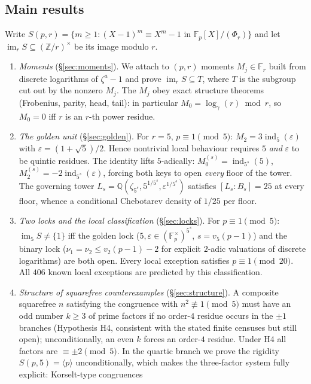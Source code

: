 \documentclass[11pt]{amsart}
\theoremstyle{definition}
\theoremstyle{remark}
\newcommand{\F}{\mathbb{F}}
\newcommand{\Z}{\mathbb{Z}}
\newcommand{\Q}{\mathbb{Q}}
\newcommand{\eps}{\varepsilon}
\newcommand{\ind}{\operatorname{ind}}
\newcommand{\im}{\operatorname{im}}
\begin{document}
\subsection*{Main results}
Write $S(p,r) = \{m \ge 1 : (X-1)^m \equiv X^m - 1 \text{ in }
\F_p[X]/(\Phi_r)\}$ and let $\im_r S \subseteq (\Z/r)^\times$ be its image
modulo $r$.

\begin{enumerate}
\item \emph{Moments} (\S\ref{sec:moments}). We attach to $(p,r)$ moments
$M_j \in \F_r$ built from discrete logarithms of $\zeta^a - 1$ and prove
$\im_r S \subseteq T$, where $T$ is the subgroup cut out by the nonzero
$M_j$. The $M_j$ obey exact structure theorems (Frobenius, parity, head,
tail): in particular $M_0 = \log_\gamma(r) \bmod r$, so $M_0 = 0$ iff $r$ is
an $r$-th power residue.
\item \emph{The golden unit} (\S\ref{sec:golden}). For $r=5$,
$p \equiv 1 \pmod 5$: $M_2 = 3\ind_5(\eps)$ with $\eps = (1+\sqrt5)/2$.
Hence nontrivial local behaviour requires $5$ \emph{and} $\eps$ to be quintic
residues. The identity lifts $5$-adically: $M_0^{(s)} = \ind_{5^s}(5)$,
$M_2^{(s)} = -2\ind_{5^s}(\eps)$, forcing both keys to open \emph{every}
floor of the tower. The governing tower
$L_s = \Q(\zeta_{5^s}, 5^{1/5^s}, \eps^{1/5^s})$ satisfies $[L_s : B_s] = 25$
at every floor, whence a conditional Chebotarev density of $1/25$ per floor.
\item \emph{Two locks and the local classification} (\S\ref{sec:locks}).
For $p \equiv 1 \pmod 5$: $\im_5 S \ne \{1\}$ iff the golden lock
($5, \eps \in (\F_p^\times)^{5^s}$, $s = v_5(p-1)$) and the binary lock
($\nu_1 = \nu_2 \le v_2(p-1) - 2$ for explicit $2$-adic valuations of
discrete logarithms) are both open. Every local exception satisfies
$p \equiv 1 \pmod{20}$. All $406$ known local exceptions are predicted by
this classification.
\item \emph{Structure of squarefree counterexamples} (\S\ref{sec:structure}).
A composite squarefree $n$ satisfying the congruence with
$n^2 \not\equiv 1 \pmod 5$ must have an odd number $k \ge 3$ of prime
factors if no order-$4$ residue occurs in the $\pm1$ branches (Hypothesis
H4, consistent with the stated finite censuses but still open);
unconditionally, an even $k$ forces an order-$4$ residue. Under
H4 all factors are $\equiv \pm2 \pmod 5$. In the quartic branch we prove the
rigidity $S(p,5) = \langle p \rangle$ unconditionally, which makes the
three-factor system fully explicit: Korselt-type congruences

\end{enumerate}
\end{document}
